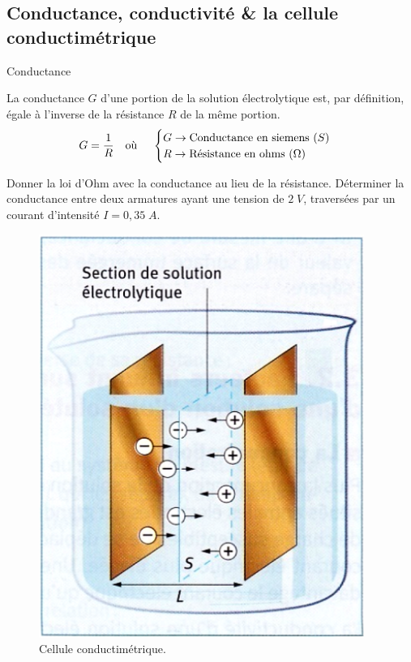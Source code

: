 \documentclass[11pt,a4paper]{article}
\begin{document}
\subsection{Conductance, conductivité \& la cellule conductimétrique}

\begin{defn}{Conductance}

La conductance $G$ d’une portion de la solution électrolytique est, par définition, égale à l’inverse de la résistance $R$ de la même portion.  
\[  G=\dfrac{1}{R}    \text{\quad où \quad} \begin{cases}
     G \rightarrow \text{Conductance en siemens }(S) \\
     R \rightarrow \text{Résistance en ohms }(\Omega) \\ 
     \end{cases}
  \]
\end{defn}
\begin{exo}
Donner la loi d’Ohm avec la conductance au lieu de la résistance. 
\vspace{1cm}
Déterminer la conductance entre deux armatures ayant une tension de $2\; V$, traversées par un courant d'intensité $I=0,35\; A$. 
\vspace{1.3cm}
\end{exo}

\begingroup
\setlength{\intextsep}{0pt}%
\setlength{\columnsep}{5pt}%

\begin{figure}
  \centering\includegraphics[width=\linewidth]{imgs/c1/celluleconducti.png}
  \caption{Cellule conductimétrique.}
\end{figure}
\end{document}
